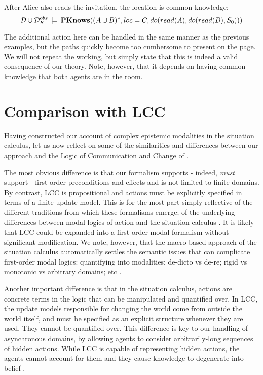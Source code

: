 ~

\begin{example}
After Alice also reads the invitation, the location is common knowledge:\[
\mathcal{D}\cup\mathcal{D}_{K}^{obs}\,\models\,\mathbf{PKnows}((A\cup B)^{*},loc=C,do(read(A),do(read(B),S_{0})))\]

\end{example}
The additional action here can be handled in the same manner as the
previous examples, but the paths quickly become too cumbersome to
present on the page. We will not repeat the working, but simply state
that this is indeed a valid consequence of our theory. Note, however,
that it depends on having common knowledge that both agents are in
the room.


\section{Comparison with LCC\label{sec:CKnowledge:Comparison}}

Having constructed our account of complex epistemic modalities in
the situation calculus, let us now reflect on some of the similarities
and differences between our approach and the Logic of Communication
and Change of \citet{vanBenthem06lcc}.

The most obvious difference is that our formalism supports - indeed,
\emph{must} support - first-order preconditions and effects and is
not limited to finite domains. By contrast, LCC is propositional and
actions must be explicitly specified in terms of a finite update model.
This is for the most part simply reflective of the different traditions
from which these formalisms emerge; of the underlying differences
between modal logics of action and the situation calculus \citep{vanbentham07ml_sitcalc}.
It is likely that LCC could be expanded into a first-order modal formalism
without significant modification. We note, however, that the macro-based
approach of the situation calculus automatically settles the semantic
issues that can complicate first-order modal logics: quantifying into
modalities; de-dicto vs de-re; rigid vs monotonic vs arbitrary domains;
etc \citep{fitting98fo_ml}.

Another important difference is that in the situation calculus, actions
are concrete terms in the logic that can be manipulated and quantified
over. In LCC, the update models responsible for changing the world
come from outside the world itself, and must be specified as an explicit
structure whenever they are used. They cannot be quantified over.
This difference is key to our handling of asynchronous domains, by
allowing agents to consider arbitrarily-long sequences of hidden actions.
While LCC is capable of representing hidden actions, the agents cannot
account for them and they cause knowledge to degenerate into belief
\citep[section 5.2]{vanBenthem06lcc}.

